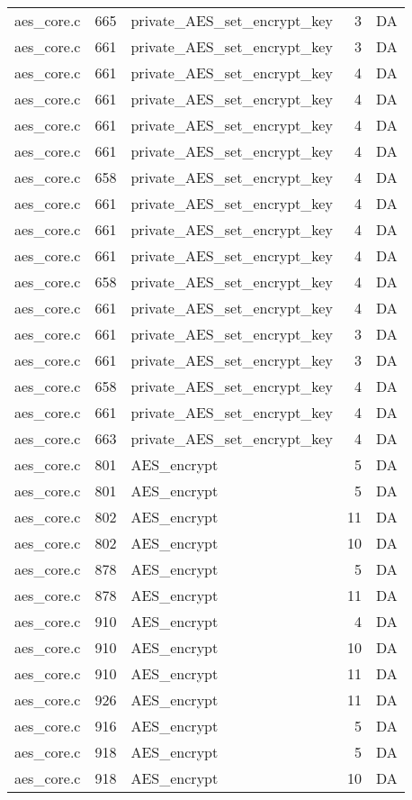 \begin{table}[h!]
\begin{tabular}{lrlrr}
aes\_core.c& 665&private\_AES\_set\_encrypt\_key&3 &DA\\
aes\_core.c& 661&private\_AES\_set\_encrypt\_key&3 &DA\\
aes\_core.c& 661&private\_AES\_set\_encrypt\_key&4 &DA\\
aes\_core.c& 661&private\_AES\_set\_encrypt\_key&4 &DA\\
aes\_core.c& 661&private\_AES\_set\_encrypt\_key&4 &DA\\
aes\_core.c& 661&private\_AES\_set\_encrypt\_key&4 &DA\\
aes\_core.c& 658&private\_AES\_set\_encrypt\_key&4 &DA\\
aes\_core.c& 661&private\_AES\_set\_encrypt\_key&4 &DA\\
aes\_core.c& 661&private\_AES\_set\_encrypt\_key&4 &DA\\
aes\_core.c& 661&private\_AES\_set\_encrypt\_key&4 &DA\\
aes\_core.c& 658&private\_AES\_set\_encrypt\_key&4 &DA\\
aes\_core.c& 661&private\_AES\_set\_encrypt\_key&4 &DA\\
aes\_core.c& 661&private\_AES\_set\_encrypt\_key&3 &DA\\
aes\_core.c& 661&private\_AES\_set\_encrypt\_key&3 &DA\\
aes\_core.c& 658&private\_AES\_set\_encrypt\_key&4 &DA\\
aes\_core.c& 661&private\_AES\_set\_encrypt\_key&4 &DA\\
aes\_core.c& 663&private\_AES\_set\_encrypt\_key&4 &DA\\
aes\_core.c& 801&AES\_encrypt&5 &DA\\
aes\_core.c& 801&AES\_encrypt&5 &DA\\
aes\_core.c& 802&AES\_encrypt&11&DA\\
aes\_core.c& 802&AES\_encrypt&10&DA\\
aes\_core.c& 878&AES\_encrypt&5 &DA\\
aes\_core.c& 878&AES\_encrypt&11&DA\\
aes\_core.c& 910&AES\_encrypt&4 &DA\\
aes\_core.c& 910&AES\_encrypt&10&DA\\
aes\_core.c& 910&AES\_encrypt&11&DA\\
aes\_core.c& 926&AES\_encrypt&11&DA\\
aes\_core.c& 916&AES\_encrypt&5 &DA\\
aes\_core.c& 918&AES\_encrypt&5 &DA\\
aes\_core.c& 918&AES\_encrypt&10&DA\\

\end{tabular}
\end{table}
